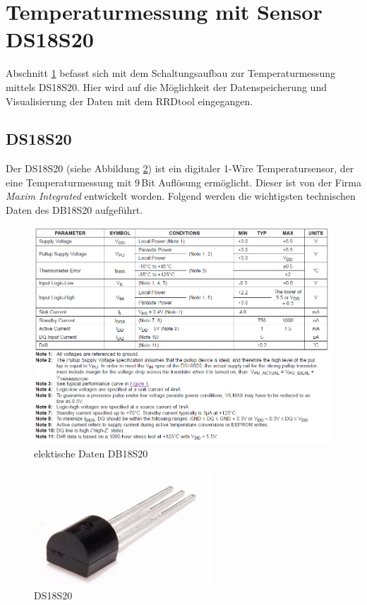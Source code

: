 \section{Temperaturmessung mit Sensor DS18S20}
\label{section_DS18S20}
Abschnitt \ref{section_DS18S20} befasst sich mit dem Schaltungsaufbau zur Temperaturmessung mittels DS18S20. Hier wird auf die Möglichkeit der Datenspeicherung und Visualisierung der Daten mit dem RRDtool eingegangen.
 

\subsection{DS18S20}
\label{subsection_DS18S20}
Der DS18S20 (siehe Abbildung \ref{Abb_DS18S20}) ist ein digitaler 1-Wire Temperatursensor, der eine Temperaturmessung mit 9\,Bit Auflösung ermöglicht. Dieser ist von der Firma \textit{Maxim Integrated} entwickelt worden.
Folgend werden die wichtigsten technischen Daten des DB18S20 aufgeführt.

\begin{figure}[!h] 
  \centering
     \includegraphics[scale=.6]{BilderAllgemein/Daten_DB18S20.png}
  \caption{elektische Daten DB18S20 \citep[S. 2]{Datenblatt_DB18S20}}
  \label{Abb_elektrische_Daten_DS18S20}
\end{figure}

\begin{figure}[!h] 
  \centering
     \includegraphics[scale=.4]{BilderAllgemein/DS18S20.png}
  \caption{DS18S20 \citep{Bild_DS18S20}}
  \label{Abb_DS18S20}
\end{figure}

